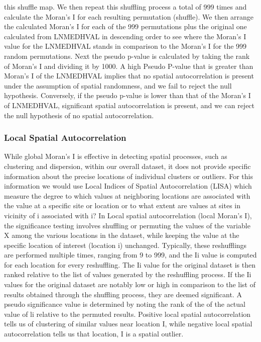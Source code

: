 \documentclass[
]{article}
\begin{document}
this shuffle map. We then repeat this shuffling process a total of 999
times and calculate the Moran's I for each resulting permutation
(shuffle). We then arrange the calculated Moran's I for each of the 999
permutations plus the original one calculated from LNMEDHVAL in
descending order to see where the Moran's I value for the LNMEDHVAL
stands in comparison to the Moran's I for the 999 random permutations.
Next the pseudo p-value is calculated by taking the rank of Moran's I
and dividing it by 1000. A high Pseudo P-value that is greater than
Moran's I of the LNMEDHVAL implies that no spatial autocorrelation is
present under the assumption of spatial randomness, and we fail to
reject the null hypothesis. Conversely, if the pseudo p-value is lower
than that of the Moran's I of LNMEDHVAL, significant spatial
autocorrelation is present, and we can reject the null hypothesis of no
spatial autocorrelation.

\hypertarget{local-spatial-autocorrelation}{%
\subsubsection{Local Spatial
Autocorrelation}\label{local-spatial-autocorrelation}}

While global Moran's I is effective in detecting spatial processes, such
as clustering and dispersion, within our overall dataset, it does not
provide specific information about the precise locations of individual
clusters or outliers. For this information we would use Local Indices of
Spatial Autocorrelation (LISA) which measure the degree to which values
at neighboring locations are associated with the value at a specific
site or location or to what extent are values at sites in vicinity of i
associated with i? In Local spatial autocorrelation (local Moran's I),
the significance testing involves shuffling or permuting the values of
the variable X among the various locations in the dataset, while keeping
the value at the specific location of interest (location i) unchanged.
Typically, these reshufflings are performed multiple times, ranging from
9 to 999, and the Ii value is computed for each location for every
reshuffling. The Ii value for the original dataset is then ranked
relative to the list of values generated by the reshuffling process. If
the Ii values for the original dataset are notably low or high in
comparison to the list of results obtained through the shuffling
process, they are deemed significant. A pseudo significance value is
determined by noting the rank of the of the actual value of li relative
to the permuted results. Positive local spatial autocorrelation tells us
of clustering of similar values near location I, while negative local
spatial autocorrelation tells us that location, I is a spatial outlier.
\end{document}
